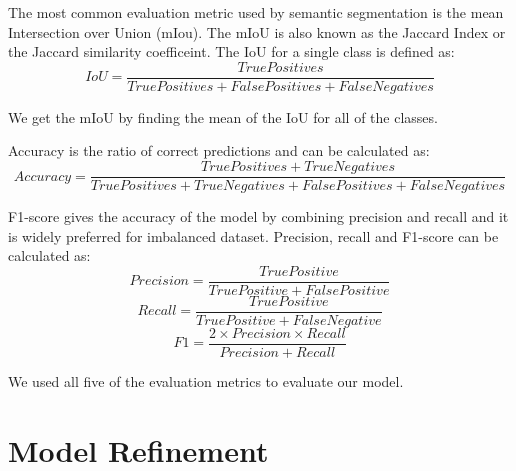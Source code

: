 The most common evaluation metric used by semantic segmentation is the mean Intersection over Union (mIou). The mIoU is also known as the Jaccard Index or the Jaccard similarity coefficeint. The IoU for a single class is defined as:
\begin{equation}
    IoU = \frac{True Positives}{True Positives + False Positives + False Negatives}
\end{equation}

We get the mIoU by finding the mean of the IoU for all of the classes.

Accuracy is the ratio of correct predictions and can be calculated as:
\begin{equation}
     Accuracy = \frac{True Positives + True Negatives}{True Positives + True Negatives + False Positives + False Negatives}
 \end{equation}

 F1-score gives the accuracy of the model by combining precision and recall and it is widely preferred for imbalanced dataset. Precision, recall and F1-score can be calculated as:
 \begin{equation}
     Precision = \frac{True Positive}{True Positive + False Positive}
 \end{equation}
 \begin{equation}
     Recall = \frac{True Positive}{True Positive + False Negative}
 \end{equation}
\begin{equation}
     F1 = \frac{2 \times Precision \times Recall}{Precision + Recall}
 \end{equation}

 We used all five of the evaluation metrics to evaluate our model.



\section{Model Refinement}
